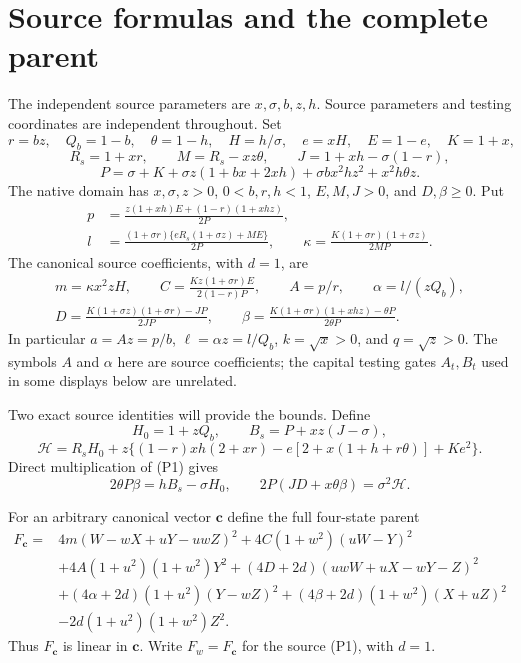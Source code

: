 \section{Source formulas and the complete parent}\label{sec:source-setup}
The independent source parameters are $x,\sigma,b,z,h$. Source
parameters and testing coordinates are independent throughout.
Set
\[
 r=bz,\quad Q_b=1-b,\quad\theta=1-h,\quad H=h/\sigma,\quad
 e=xH,\quad E=1-e,\quad K=1+x,
\]
\[
 R_s=1+xr,\qquad M=R_s-xz\theta,\qquad
 J=1+xh-\sigma(1-r),
\]
\[
 P=\sigma+K+\sigma z(1+bx+2xh)
              +\sigma bx^2hz^2+x^2h\theta z.
\]
The native domain has $x,\sigma,z>0$, $0<b,r,h<1$,
$E,M,J>0$, and $D,\beta\ge0$. Put
\[
 \begin{split}
 p&=\frac{z(1+xh)E+(1-r)(1+xhz)}{2P},\\
 l&=\frac{(1+\sigma r)\{eR_s(1+\sigma z)+ME\}}{2P},\qquad
 \kappa=\frac{K(1+\sigma r)(1+\sigma z)}{2MP}.
 \end{split}
\]
The canonical source coefficients, with $d=1$, are
\[
 \begin{gathered}
 m=\kappa x^2zH,\qquad C=\frac{Kz(1+\sigma r)E}{2(1-r)P},
 \qquad A=p/r,\qquad \alpha=l/(zQ_b),\\
 D=\frac{K(1+\sigma z)(1+\sigma r)-JP}{2JP},\qquad
 \beta=\frac{K(1+\sigma r)(1+xhz)-\theta P}{2\theta P}.
 \end{gathered}\tag{P1}
\]
In particular $a=Az=p/b$, $\ell=\alpha z=l/Q_b$,
$k=\sqrt x>0$, and $q=\sqrt z>0$. The symbols $A$ and $\alpha$
here are source coefficients; the capital testing gates $A_t,B_t$
used in some displays below are unrelated.

Two exact source identities will provide the bounds. Define
\[
 H_0=1+zQ_b,\qquad B_s=P+xz(J-\sigma),
\]
\[
 \mathcal H=R_sH_0+z\{(1-r)xh(2+xr)
       -e[2+x(1+h+r\theta)]+Ke^2\}.
\]
Direct multiplication of (P1) gives
\[
 2\theta P\beta=hB_s-\sigma H_0,\qquad
 2P(JD+x\theta\beta)=\sigma^2\mathcal H. \tag{BE}
\]

For an arbitrary canonical vector $\mathbf c$ define the full
four-state parent
\begin{align*}
 F_{\mathbf c}={}&4m(W-wX+uY-uwZ)^2
    +4C(1+w^2)(uW-Y)^2\\
 &+4A(1+u^2)(1+w^2)Y^2
    +(4D+2d)(uwW+uX-wY-Z)^2\\
 &+(4\alpha+2d)(1+u^2)(Y-wZ)^2
    +(4\beta+2d)(1+w^2)(X+uZ)^2\\
 &-2d(1+u^2)(1+w^2)Z^2.
 \tag{P4}
\end{align*}
Thus $F_{\mathbf c}$ is linear in $\mathbf c$. Write $F_w=F_{\mathbf c}$
for the source (P1), with $d=1$.

